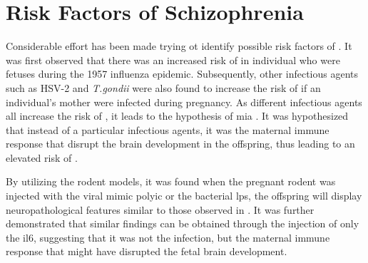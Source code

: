 \documentclass[12pt]{book}
\newcommand*{\glng}{\glsentrylong}
\begin{document}
	\section{Risk Factors of Schizophrenia}
	Considerable effort has been made trying ot identify possible risk factors of \glng{scz}. 
	It was first observed that there was an increased risk of \glng{scz} in individual who were fetuses during the 1957 influenza epidemic\citep{Mednick1958}. 
	Subsequently, other infectious agents such as HSV-2 and \textit{T.gondii} were also found to increase the risk of \glng{scz} if an individual's mother were infected during pregnancy.
	As different infectious agents all increase the risk of \glng{scz}, it leads to the hypothesis of \gls{mia} \citep{Brown2010}.
	It was hypothesized that instead of a particular infectious agents, it was the maternal immune response that disrupt the brain development in the offspring, thus leading to an elevated risk of \glng{scz}.
		
	By utilizing the rodent models, it was found when the pregnant rodent was injected with the viral mimic \gls{polyic} or the bacterial \gls{lps}, the offspring will display neuropathological features similar to those observed in \glng{scz}\citep{Meyer2009b}.
	It was further demonstrated that similar findings can be obtained through the injection of only the \gls{il6}\citep{Smith2007}, suggesting that it was not the infection, but the maternal immune response that might have disrupted the fetal brain development.
	
\end{document}

